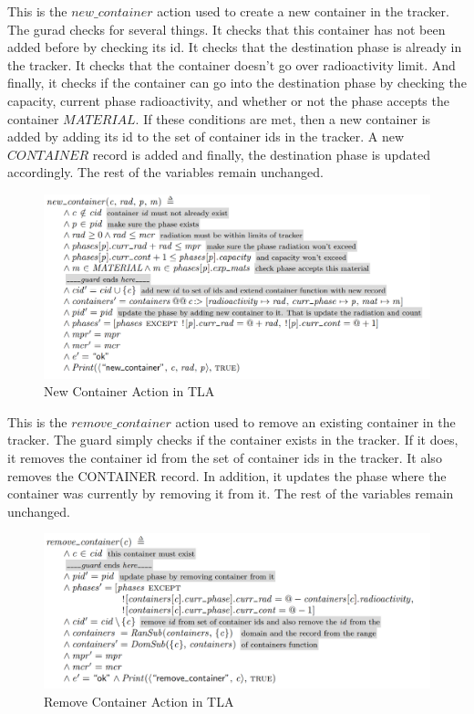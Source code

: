 \newpage
This is the $new\_container$ action used to create a new container in the tracker. The gurad checks for several things. It checks that this container has not been added before by checking its id. It checks that the destination phase is already in the tracker. It checks that the container doesn't go over radioactivity limit. And finally, it checks if the container can go into the destination phase by checking the capacity, current phase radioactivity, and whether or not the phase accepts the container $MATERIAL$. If these conditions are met, then a new container is added by adding its id to the set of container ids in the tracker. A new $CONTAINER$ record is added and finally, the destination phase is updated accordingly. The rest of the variables remain unchanged.   
\begin{figure}[!htb]
\begin{center}
\includegraphics[width=.99\textwidth]{images/new_container.png}
\end{center}
\caption{New Container Action in TLA}
\label{fig:new_container_action}
\end{figure}


\newpage
This is the $remove\_container$ action used to remove an existing container in the tracker. The guard simply checks if the container exists in the tracker. If it does, it removes the container id from the set of container ids in the tracker. It also removes the CONTAINER record. In addition, it updates the phase where the container was currently by removing it from it. The rest of the variables remain unchanged.   
\begin{figure}[!htb]
\begin{center}
\includegraphics[width=.99\textwidth]{images/remove_container.png}
\end{center}
\caption{Remove Container Action in TLA}
\label{fig:remove_container_action}
\end{figure}


